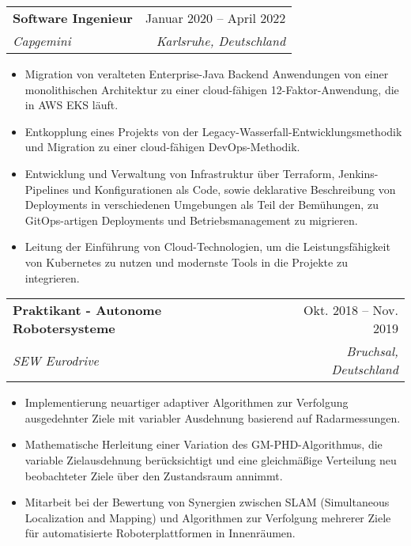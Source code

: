 \documentclass[a4paper,12pt]{article}
\makeatletter
\newcommand{\resumeItem}[1]{
	\item\small{
		{#1 \vspace{-2pt}}
	}
}
\newcommand{\resumeSubheading}[4]{
	\vspace{-2pt}\item
	\begin{tabular*}{0.97\textwidth}[t]{l@{\extracolsep{\fill}}r}
		\textbf{#1} & #2 \\
		\textit{\small#3} & \textit{\small #4} \\
	\end{tabular*}\vspace{-7pt}
}
\newcommand{\resumeSubSubheading}[2]{
	\item
	\begin{tabular*}{0.97\textwidth}{l@{\extracolsep{\fill}}r}
		\textit{\small#1} & \textit{\small #2} \\
	\end{tabular*}\vspace{-7pt}
}
\newcommand{\resumeItemListStart}{\begin{itemize}}
\newcommand{\resumeItemListEnd}{\end{itemize}\vspace{-5pt}}
\makeatother
\begin{document}

\resumeSubheading{Software Ingenieur}{Januar 2020 -- April 2022 }{Capgemini}{Karlsruhe, Deutschland}
\resumeItemListStart
	\resumeItem{Migration von veralteten Enterprise-Java Backend Anwendungen von einer monolithischen Architektur zu einer cloud-fähigen 12-Faktor-Anwendung, die in AWS EKS läuft.}
	\resumeItem{Entkopplung eines Projekts von der Legacy-Wasserfall-Entwicklungsmethodik und Migration zu einer cloud-fähigen DevOps-Methodik.}
	\resumeItem{Entwicklung und Verwaltung von Infrastruktur über Terraform, Jenkins-Pipelines und Konfigurationen als Code, sowie deklarative Beschreibung von Deployments in verschiedenen Umgebungen als Teil der Bemühungen, zu GitOps-artigen Deployments und Betriebsmanagement zu migrieren.}
	\resumeItem{Leitung der Einführung von Cloud-Technologien, um die Leistungsfähigkeit von Kubernetes zu nutzen und modernste Tools in die Projekte zu integrieren.}
\resumeItemListEnd

\resumeSubheading
{Praktikant - Autonome Robotersysteme}{Okt. 2018 -- Nov. 2019}
{SEW Eurodrive}{Bruchsal, Deutschland}
\resumeItemListStart
\resumeItem{Implementierung neuartiger adaptiver Algorithmen zur Verfolgung ausgedehnter Ziele mit variabler Ausdehnung basierend auf Radarmessungen.}
\resumeItem{Mathematische Herleitung einer Variation des GM-PHD-Algorithmus, die variable Zielausdehnung berücksichtigt und eine gleichmäßige Verteilung neu beobachteter Ziele über den Zustandsraum annimmt.}
\resumeItem{Mitarbeit bei der Bewertung von Synergien zwischen SLAM (Simultaneous Localization and Mapping) und Algorithmen zur Verfolgung mehrerer Ziele für automatisierte Roboterplattformen in Innenräumen.}
\resumeItemListEnd
\end{document}

